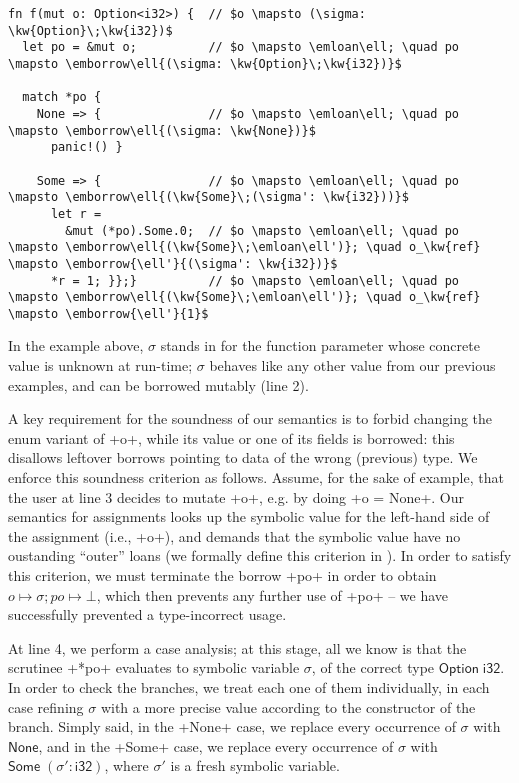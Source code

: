 \documentclass[acmsmall,screen]{acmart}
\newif\iflong
\newif\ifshort
\newcommand{\fref}[1]{Figure~\ref{fig:#1}}
\newcommand\kw[1]{\ensuremath{\mathsf{#1}}}
\newcommand\emborrow[2]{\ensuremath{\mathsf{borrow}^m\,#1\;#2}}
\newcommand\emloan[1]{\ensuremath{\mathsf{loan}^m\,#1}}
\begin{document}
\begin{verbatim}
fn f(mut o: Option<i32>) {  // $o \mapsto (\sigma: \kw{Option}\;\kw{i32})$
  let po = &mut o;          // $o \mapsto \emloan\ell; \quad po \mapsto \emborrow\ell{(\sigma: \kw{Option}\;\kw{i32})}$

  match *po {
    None => {               // $o \mapsto \emloan\ell; \quad po \mapsto \emborrow\ell{(\sigma: \kw{None})}$
      panic!() }

    Some => {               // $o \mapsto \emloan\ell; \quad po \mapsto \emborrow\ell{(\kw{Some}\;(\sigma': \kw{i32}))}$
      let r =
        &mut (*po).Some.0;  // $o \mapsto \emloan\ell; \quad po \mapsto \emborrow\ell{(\kw{Some}\;\emloan\ell')}; \quad o_\kw{ref} \mapsto \emborrow{\ell'}{(\sigma': \kw{i32})}$
      *r = 1; }};}          // $o \mapsto \emloan\ell; \quad po \mapsto \emborrow\ell{(\kw{Some}\;\emloan\ell')}; \quad o_\kw{ref} \mapsto \emborrow{\ell'}{1}$
\end{verbatim}

In the example above, $\sigma$ stands in for the function parameter whose
concrete value is unknown at run-time; $\sigma$ behaves like any other value
from our previous examples, and can be borrowed mutably (line 2).

A key requirement for the soundness of our semantics is to forbid changing
the enum variant of \li+o+, while its value or one of its fields is
borrowed: this disallows leftover borrows pointing to data of the wrong
(previous) type. We enforce this soundness criterion as follows. Assume, for the
sake of example, that the user at line 3 decides to mutate \li+o+, e.g. by doing
\li+o = None+. Our semantics for assignments looks up the symbolic value for the
left-hand side of the assignment (i.e., \li+o+), and demands that the symbolic
value have no oustanding ``outer'' loans (we formally define this criterion in
\iflong\fref{no-outer-loans}\fi\ifshort\cite{longversion}\fi). In order to satisfy this criterion, we must terminate
the borrow \li+po+ in order to obtain $o \mapsto \sigma; po \mapsto \bot$, which
then prevents any further use of \li+po+ -- we have successfully prevented a
type-incorrect usage.

At line 4, we perform a case analysis; at this stage, all we know is that the
scrutinee \li+*po+ evaluates to symbolic variable $\sigma$, of the correct type
$\kw{Option}\;\kw{i32}$. In order to check the branches, we treat each one of
them individually, in each case refining $\sigma$ with a more precise value
according to the constructor of the branch.
Simply said, in the \li+None+ case, we replace every occurrence of $\sigma$ with
$\kw{None}$, and in the \li+Some+ case, we replace every occurrence of $\sigma$
with $\kw{Some}\;(\sigma':\kw{i32})$, where $\sigma'$ is a fresh symbolic
variable.
\end{document}
